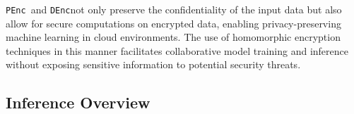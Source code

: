 \documentclass[conference]{IEEEtran}
\newcommand{\DEnc}{\texttt{DEnc}}
\newcommand{\PEnc}{\texttt{PEnc}}
\begin{document}
\PEnc~and \DEnc not only preserve the confidentiality of the input data but also allow for secure computations on encrypted data, enabling privacy-preserving machine learning in cloud environments. The use of homomorphic encryption techniques in this manner facilitates collaborative model training and inference without exposing sensitive information to potential security threats.





\subsection{Inference Overview}
\end{document}
